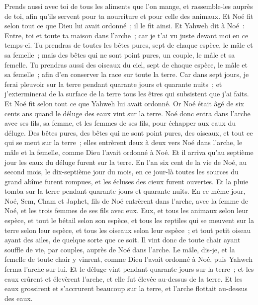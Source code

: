 \begin{multicols}{2}
Prends aussi avec toi de tous les aliments que l'on mange, et rassemble-les auprès de toi, afin qu'ils servent pour ta nourriture et pour celle des animaux.
Et Noé fit selon tout ce que Dieu lui avait ordonné~; il le fit ainsi.
\VerseOne{}Et Yahweh dit à Noé~: Entre, toi et toute ta maison dans l'arche~; car je t'ai vu juste devant moi en ce temps-ci. 
Tu prendras de toutes les bêtes pures, sept de chaque espèce, le mâle et sa femelle~; mais des bêtes qui ne sont point pures, un couple, le mâle et sa femelle.
Tu prendras aussi des oiseaux du ciel, sept de chaque espèce, le mâle et sa femelle~; afin d'en conserver la race sur toute la terre.
Car dans sept jours, je ferai pleuvoir sur la terre pendant quarante jours et quarante nuits~; et j'exterminerai de la surface de la terre tous les êtres qui subsistent que j'ai faits.
Et Noé fit selon tout ce que Yahweh lui avait ordonné.
Or Noé était âgé de six cents ans quand le déluge des eaux vint sur la terre.
Noé donc entra dans l'arche avec ses fils, sa femme, et les femmes de ses fils, pour échapper aux eaux du déluge.
Des bêtes pures, des bêtes qui ne sont point pures, des oiseaux, et tout ce qui se meut sur la terre~;
elles entrèrent deux à deux vers Noé dans l'arche, le mâle et la femelle, comme Dieu l'avait ordonné à Noé.
Et il arriva qu'au septième jour les eaux du déluge furent sur la terre.
En l'an six cent de la vie de Noé, au second mois, le dix-septième jour du mois, en ce jour-là toutes les sources du grand abîme furent rompues, et les écluses des cieux furent ouvertes.
Et la pluie tomba sur la terre pendant quarante jours et quarante nuits.
En ce même jour, Noé, Sem, Cham et Japhet, fils de Noé entrèrent dans l'arche, avec la femme de Noé, et les trois femmes de ses fils avec eux.
Eux, et tous les animaux selon leur espèce, et tout le bétail selon son espèce, et tous les reptiles qui se meuvent sur la terre selon leur espèce, et tous les oiseaux selon leur espèce~; et tout petit oiseau ayant des ailes, de quelque sorte que ce soit.
Il vint donc de toute chair ayant souffle de vie, par couples, auprès de Noé dans l'arche. 
Le mâle, dis-je, et la femelle de toute chair y vinrent, comme Dieu l'avait ordonné à Noé, puis Yahweh ferma l'arche sur lui.
Et le déluge vint pendant quarante jours sur la terre~; et les eaux crûrent et élevèrent l'arche, et elle fut élevée au-dessus de la terre.
Et les eaux grossirent et s'accrurent beaucoup sur la terre, et l'arche flottait au-dessus des eaux.

\end{multicols}
